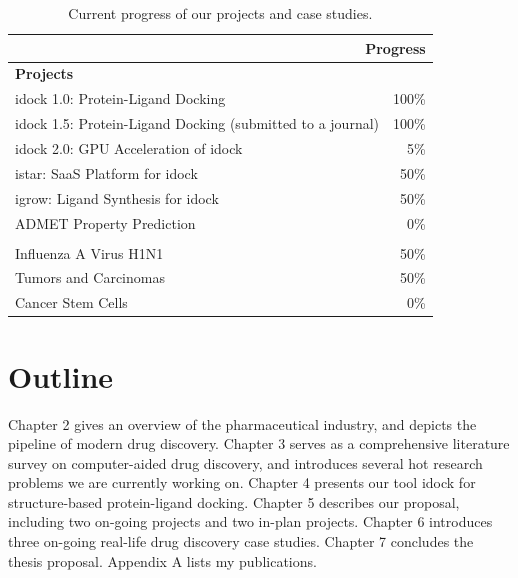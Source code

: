 \begin{table}
\centering
\begin{tabular*}
{\linewidth}
{@{\extracolsep{\fill}}lr}
\toprule
\multicolumn{2}{r}{\textbf{Progress}}\\
\midrule
\multicolumn{2}{l}{\textbf{Projects}}\\
idock 1.0: Protein-Ligand Docking \citep{1153} & 100\% \\
idock 1.5: Protein-Ligand Docking (submitted to a journal) & 100\% \\
idock 2.0: GPU Acceleration of idock & 5\% \\
istar: SaaS Platform for idock & 50\% \\
igrow: Ligand Synthesis for idock & 50\% \\
ADMET Property Prediction & 0\% \\
\noalign{\smallskip\smallskip}
\multicolumn{2}{l}{\textbf{Case studies}}\\
Influenza A Virus H1N1 & 50\% \\
Tumors and Carcinomas & 50\% \\
Cancer Stem Cells & 0\% \\
\bottomrule
\end{tabular*}
\caption{Current progress of our projects and case studies.}
\label{Introduction:Progress}
\end{table}

\section{Outline}

Chapter 2 gives an overview of the pharmaceutical industry, and depicts the pipeline of modern drug discovery. Chapter 3 serves as a comprehensive literature survey on computer-aided drug discovery, and introduces several hot research problems we are currently working on. Chapter 4 presents our tool idock for structure-based protein-ligand docking. Chapter 5 describes our proposal, including two on-going projects and two in-plan projects. Chapter 6 introduces three on-going real-life drug discovery case studies. Chapter 7 concludes the thesis proposal. Appendix A lists my publications.

\chapterend
